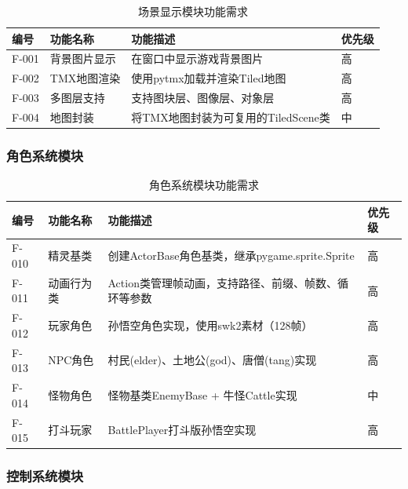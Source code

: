 \documentclass[12pt,a4paper]{article}
\begin{document}
\begin{table}[H]
\centering
\caption{场景显示模块功能需求}
\renewcommand{\arraystretch}{1.3}
\begin{tabularx}{\textwidth}{>{\centering\arraybackslash}m{2cm}>{\centering\arraybackslash}m{3cm}>{\centering\arraybackslash}m{5cm}>{\centering\arraybackslash}m{2cm}}
\toprule
\textbf{编号} & \textbf{功能名称} & \textbf{功能描述} & \textbf{优先级} \\
\midrule
F-001 & 背景图片显示 & 在窗口中显示游戏背景图片 & 高 \\
F-002 & TMX地图渲染 & 使用pytmx加载并渲染Tiled地图 & 高 \\
F-003 & 多图层支持 & 支持图块层、图像层、对象层 & 高 \\
F-004 & 地图封装 & 将TMX地图封装为可复用的TiledScene类 & 中 \\
\bottomrule
\end{tabularx}
\end{table}

\subsubsection{角色系统模块}

\begin{table}[H]
\centering
\caption{角色系统模块功能需求}
\renewcommand{\arraystretch}{1.3}
\begin{tabularx}{\textwidth}{>{\centering\arraybackslash}m{2cm}>{\centering\arraybackslash}m{3cm}>{\centering\arraybackslash}m{5cm}>{\centering\arraybackslash}m{2cm}}
\toprule
\textbf{编号} & \textbf{功能名称} & \textbf{功能描述} & \textbf{优先级} \\
\midrule
F-010 & 精灵基类 & 创建ActorBase角色基类，继承pygame.sprite.Sprite & 高 \\
F-011 & 动画行为类 & Action类管理帧动画，支持路径、前缀、帧数、循环等参数 & 高 \\
F-012 & 玩家角色 & 孙悟空角色实现，使用swk2素材（128帧） & 高 \\
F-013 & NPC角色 & 村民(elder)、土地公(god)、唐僧(tang)实现 & 高 \\
F-014 & 怪物角色 & 怪物基类EnemyBase + 牛怪Cattle实现 & 中 \\
F-015 & 打斗玩家 & BattlePlayer打斗版孙悟空实现 & 高 \\
\bottomrule
\end{tabularx}
\end{table}

\subsubsection{控制系统模块}
\end{document}
